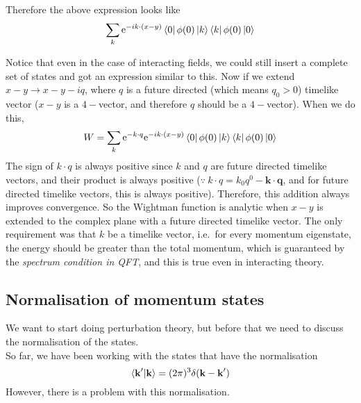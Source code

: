 \documentclass[11pt, notitlepage]{report}
\newcommand{\e}{\mathrm{e}}
\numberwithin{equation}{section}
\begin{document}
    Therefore the above expression looks like 
    \begin{equation*}
        \sum_k \e^{-ik\cdot (x - y)}  \bra{0} \phi(0) \ket{k}   \bra{k}\phi(0) \ket{0}
    \end{equation*}

    Notice that even in the case of interacting fields, we could still insert a complete set of states and got an expression similar to this. Now if we extend \(x-y \to x-y - iq\), where \(q\) is a future directed (which means \(q_0 >0\)) timelike vector (\(x-y\) is a \(4-\)vector, and therefore \(q\) should be a \(4-\)vector). When we do this, 
    \begin{equation*}
        W = \sum_k \e^{-k\cdot q} \e^{-ik\cdot (x - y)}  \bra{0} \phi(0) \ket{k}   \bra{k}\phi(0) \ket{0}
    \end{equation*}
    The sign of \(k\cdot q\) is always positive since \(k\) and \(q\) are future directed timelike vectors, and their product is always positive (\(\because~k\cdot q = k_0q^0 - \textbf{k}\cdot \textbf{q}\), and for future directed timelike vectors, this is always positive). Therefore, this addition always improves convergence. So the Wightman function is analytic when \(x-y\) is extended to the complex plane with a future directed timelike vector. The only requirement was that \(k\) be a timelike vector, i.e.\ for every momentum eigenstate, the energy should be greater than the total momentum, which is guaranteed by the \textit{spectrum condition in QFT}, and this is true even in interacting theory. 


    \subsection{Normalisation of momentum states}
    We want to start doing perturbation theory, but before that we need to discuss the normalisation of the states. \\

    So far, we have been working with the states that have the normalisation 
    \begin{equation*}
        \braket{\textbf{k}'|\textbf{k}} = (2\pi)^3\delta(\textbf{k} - \textbf{k}')
    \end{equation*}
    However, there is a problem with this normalisation. \\
\end{document}
